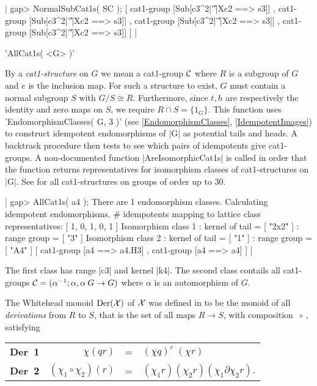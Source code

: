 |    gap> NormalSubCat1s( SC );
    [ cat1-group [Sub[c3^2|'\|'|Xc2 ==> s3]] ,
      cat1-group [Sub[c3^2|'\|'|Xc2 ==> s3]] , 
      cat1-group [Sub[c3^2|'\|'|Xc2 ==> s3]] ,
      cat1-group [Sub[c3^2|'\|'|Xc2 ==> s3]]  ] |

%

'AllCat1s( <G> )'

By a {\em cat1-structure} on $G$ we mean a cat1-group ${\cal C}$ where
$R$ is a subgroup of  $G$ and $e$ is the   inclusion map.  For such  a
structure to exist, $G$  must contain a normal  subgroup $S$ with $G/S
\cong R$.  Furthermore, since $t,h$ are  respectively the identity and
zero maps  on $S$, we  require $R \cap S  = \{ 1_G \}$.  This function
uses 'EndomorphismClasses(  G,  3  )'  (see \ref{EndomorphismClasses},
\ref{IdempotentImages}) to construct  idempotent endomorphisms  of |G|
as potential tails and heads.  A backtrack procedure then tests to see
which    pairs  of idempotents   give  cat1-groups.   A non-documented
function  |AreIsomorphicCat1s| is called  in  order that the  function
returns representatives for  isomorphism classes of cat1-structures on
|G|.  See \cite{xmodAW1} for all cat1-structures  on groups of order up to
30.

|    gap> AllCat1s( a4 );
    There are 1 endomorphism classes.
    Calculating idempotent endomorphisms.
    # idempotents mapping to lattice class representatives:
    [ 1, 0, 1, 0, 1 ]
    Isomorphism class 1
    : kernel of tail = [ "2x2" ]
    :    range group = [ "3" ]
    Isomorphism class 2
    : kernel of tail = [ "1" ]
    :    range group = [ "A4" ]
    [ cat1-group [a4 ==> a4.H3] , cat1-group [a4 ==> a4] ]  |

The first class has range |c3| and kernel |k4|.
The second class contails all cat1-groups 
${\cal C} = (\alpha^{-1}; \alpha, \alpha \: G \to G)$
where  $\alpha$  is an automorphism of $G$.

\newpage



%

The Whitehead monoid $\rm{Der}({\cal X})$ of ${\cal X}$ was defined in
\cite{xmodW2} to be the monoid of all {\it derivations} from $ R $ to $S$,
that is the set of all maps $R \to S$, with  composition $\ \circ \ $,
satisfying
\begin{center}
\begin{tabular}{c r c l }
\textbf{Der\ 1\:}  &  $\chi(qr)$              &  = 
           & $(\chi q)^{r} \; (\chi r)$  \\
\textbf{Der\ 2\:}  &  $(\chi_1 \circ \chi_2)(r)$  &  =
           & $(\chi_1 r)(\chi_2 r)(\chi_1 \partial \chi_2 r)$. 
\end{tabular}
\end{center}

